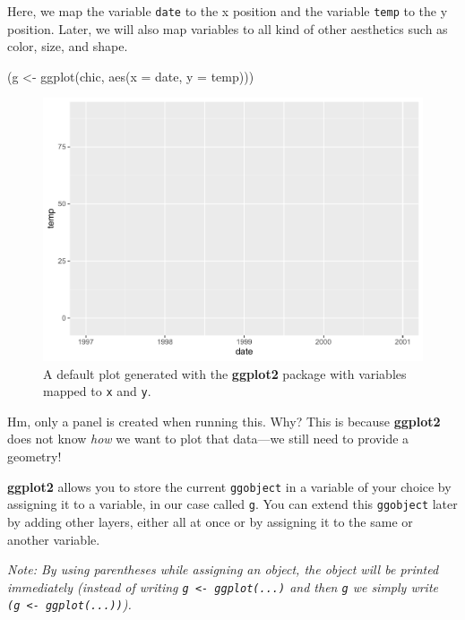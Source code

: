 \documentclass[
]{krantz}
\makeatletter
\newenvironment{Shaded}{\begin{snugshade}}{\end{snugshade}}
\newcommand{\AttributeTok}[1]{\textcolor[rgb]{0.61,0.61,0.61}{#1}}
\newcommand{\FunctionTok}[1]{\textcolor[rgb]{0,0,0}{#1}}
\newcommand{\NormalTok}[1]{#1}
\newcommand{\OtherTok}[1]{\textcolor[rgb]{0.37,0.37,0.37}{#1}}
\newenvironment{kframe}{%
\medskip{}
\setlength{\fboxsep}{.8em}
 \def\at@end@of@kframe{}%
 \ifinner\ifhmode%
  \def\at@end@of@kframe{\end{minipage}}%
  \begin{minipage}{\columnwidth}%
 \fi\fi%
 \def\FrameCommand##1{\hskip\@totalleftmargin \hskip-\fboxsep
 \colorbox{shadecolor}{##1}\hskip-\fboxsep
     \hskip-\linewidth \hskip-\@totalleftmargin \hskip\columnwidth}%
 \MakeFramed {\advance\hsize-\width
   \@totalleftmargin\z@ \linewidth\hsize
   \@setminipage}}%
 {\par\unskip\endMakeFramed%
 \at@end@of@kframe}
\renewenvironment{Shaded}{\begin{kframe}}{\end{kframe}}
\makeatother
\begin{document}
Here, we map the variable \texttt{date} to the x position and the variable \texttt{temp} to the y position. Later, we will also map variables to all kind of other aesthetics such as color, size, and shape.

\begin{Shaded}
\begin{Highlighting}[]
\NormalTok{(g }\OtherTok{\textless{}{-}} \FunctionTok{ggplot}\NormalTok{(chic, }\FunctionTok{aes}\NormalTok{(}\AttributeTok{x =}\NormalTok{ date, }\AttributeTok{y =}\NormalTok{ temp)))}
\end{Highlighting}
\end{Shaded}

\begin{figure}
\centering
\includegraphics{bookdown_files/figure-latex/ggplot-1.pdf}
\caption{\label{fig:ggplot}A default plot generated with the \textbf{ggplot2} package with variables mapped to \texttt{x} and \texttt{y}.}
\end{figure}

Hm, only a panel is created when running this. Why? This is because \textbf{ggplot2} does not know \emph{how} we want to plot that data---we still need to provide a geometry!

\textbf{ggplot2} allows you to store the current \texttt{ggobject} in a variable of your choice by assigning it to a variable, in our case called \texttt{g}. You can extend this \texttt{ggobject} later by adding other layers, either all at once or by assigning it to the same or another variable.

\emph{Note: By using parentheses while assigning an object, the object will be printed immediately (instead of writing \texttt{g\ \textless{}-\ ggplot(...)} and then \texttt{g} we simply write \texttt{(g\ \textless{}-\ ggplot(...))}).}
\end{document}
